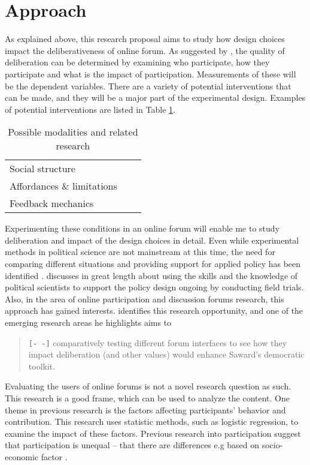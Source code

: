 \documentclass{article}
\begin{document}
\section{Approach}

As explained above, this research proposal aims to study how design choices impact the deliberativeness of online forum. As suggested by , the quality of deliberation can be determined by examining who participate, how they participate and what is the impact of participation. Measurements of these will be the dependent variables. There are a variety of potential interventions that can be made, and they will be a major part of the experimental design. Examples of potential interventions are listed in Table \ref{tab:modalities}.

\begin{table}
\begin{tabular}{lc|l}
Social structure & & \cite{sukumaran11,underhill03} \\
Affordances \& limitations & & \cite{eklundh94,danet98,donath99} \\ 
Feedback mechanics & &
\end{tabular} 
\caption{Possible modalities and related research}
\label{tab:modalities}
\end{table}

Experimenting these conditions in an online forum will enable me to study deliberation and impact of the design choices in detail. Even while experimental methods in political science are not mainstream at this time, the need for comparing different situations and providing support for applied policy has been identified \cite{green03}.  discusses in great length about using the skills and the knowledge of political scientists to support the policy design ongoing by conducting field trials. Also, in the area of online participation and discussion forums research, this approach has gained interests.  identifies this research opportunity, and one of the emerging research areas he highlights aims to

\begin{quote}
\texttt{[- -]} comparatively testing different forum interfaces to see how they impact deliberation (and other values) would enhance Saward’s democratic toolkit.
\end{quote}

Evaluating the users of online forums is not a novel research question as such. This research is a good frame, which can be used to analyze the content. One theme in previous research is the factors affecting participants' behavior and contribution. This research uses statistic methods, such as logistic regression, to examine the impact of these factors. Previous research into participation suggest that participation is unequal -- that there are differences e.g  based on socio-economic factor .
\end{document}
